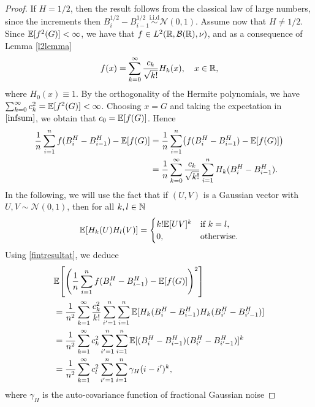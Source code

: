 \begin{proof}
    If $H=1/2$, then the result follows from the classical law of large numbers, since the increments then $B^{1/2}_{i}-B^{1/2}_{i-1}\overset{\textrm{i.i.d}}{\sim} \mathcal{N}(0,1)$. Assume now that $H\neq 1/2$. Since $\mathbb{E}[f^{2}(G)]<\infty$, we have that $f\in L^{2}\left(\R,\mathcal{B}(\R),\nu\right)$, and as a consequence of Lemma \ref{l2lemma}
    \begin{equation}\label{infsum}
        f(x)=\sum_{k=0}^{\infty}\frac{c_{k}}{\sqrt{k!}}H_{k}(x), \quad x\in \mathbb{R},
    \end{equation}
    where $H_{0}(x)\equiv 1$. By the orthogonality of the Hermite polynomials, we have $\sum_{k=0}^{\infty}c_{k}^{2}=\mathbb{E}[f^{2}(G)]<\infty$. Choosing $x=G$ and taking the expectation in $\eqref{infsum}$, we obtain that $c_{0}=\mathbb{E}[f(G)]$. Hence
    \begin{align}
        \frac{1}{n}\sum_{i=1}^{n}f(B_{i}^{H}-B_{i-1}^{H}) - \E[f(G)]&=\frac{1}{n}\sum_{i=1}^{n}\left(f(B_{i}^{H}-B_{i-1}^{H}) - \E[f(G)]\right)\\
        &= \frac{1}{n}\sum_{k=0}^{\infty}\frac{c_{k}}{\sqrt{k!}}\sum_{i=1}^{n}H_{k}(B_{i}^{H}-B_{i-1}^{H}).
    \end{align}
In the following, we will use the fact that if $(U,V)$ is a Gaussian vector with $U,V\sim\mathcal{N}(0,1)$, then for all $k,l\in\mathbb{N}$
\begin{equation}\label{fintresultat}
    \mathbb{E}[H_{k}(U)H_{l}(V)]=\begin{cases}
        k!\mathbb{E}[UV]^{k} & \mathrm{if}\hspace{2.5 pt} k=l,\\
        0, & \mathrm{otherwise}.
    \end{cases}
\end{equation}
Using \eqref{fintresultat}, we deduce
\begin{align}
    &\E\left[\left(\frac{1}{n}\sum_{i=1}^{n}f(B_{i}^{H}-B_{i-1}^{H}) - \E[f(G)]\right)^{2}\right]\\
    &= \frac{1}{n^2}\sum_{k=1}^{\infty}\frac{c_{k}^{2}}{k!}\sum_{i'=1}^{n}\sum_{i =1}^{n}\E[H_{k}(B^{H}_{i}-B_{i-1}^{H})H_{k}(B^{H}_{i'}-B^{H}_{i'-1})]\\
    &= \frac{1}{n^2}\sum_{k=1}^{\infty}c_{k}^{2}\sum_{i'=1}^{n}\sum_{i =1}^{n}\E[(B^{H}_{i}-B_{i-1}^{H})(B^{H}_{i'}-B^{H}_{i'-1})]^{k}\\
    &= \frac{1}{n^2}\sum_{k=1}^{\infty}c_{l}^{2}\sum_{i'=1}^{n}\sum_{i =1}^{n}\gamma_{H}(i-i')^{k},
\end{align}
where $\gamma_{H}$ is the auto-covariance function of fractional Gaussian noise

\end{proof}
